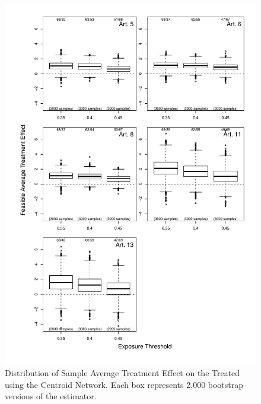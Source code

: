 \documentclass[10pt]{article}
\begin{document}
\begin{figure}[H]
	\centering
	\includegraphics[width=.8\linewidth]{../fig/matching_bloxplot_adjmat_centroid_dist.pdf}
	\caption{Distribution of Sample Average Treatment Effect on the Treated using the Centroid Network. Each box represents 2,000 bootstrap versions of the estimator.}
\end{figure}
\end{document}
